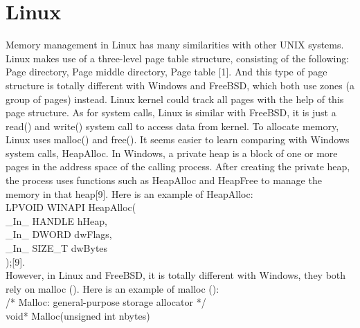 \documentclass[10pt,draftclsnofoot,peerreview,letterpaper,onecolumn,]{IEEEtran}
\begin{document}
\section{Linux}
Memory management in Linux has many similarities with other UNIX systems. Linux makes use of a three-level page table structure, consisting of the following: Page directory, Page middle directory, Page table [1]. And this type of page structure is totally different with Windows and FreeBSD, which both use zones (a group of pages) instead. Linux kernel could track all pages with the help of this page structure.
As for system calls, Linux is similar with FreeBSD, it is just a read() and write() system call to access data from kernel. To allocate memory, Linux uses malloc() and free(). It seems easier to learn comparing with Windows system calls, HeapAlloc. In Windows, a private heap is a block of one or more pages in the address space of the calling process. After creating the private heap, the process uses functions such as HeapAlloc and HeapFree to manage the memory in that heap[9].
Here is an example of HeapAlloc:
~\\LPVOID WINAPI HeapAlloc(
~\\ \_In\_ HANDLE hHeap,
~\\ \_In\_ DWORD  dwFlags,
~\\ \_In\_ SIZE\_T dwBytes
~\\);[9].
~\\However, in Linux and FreeBSD, it is totally different with Windows, they both rely on malloc ().
Here is an example of malloc ():
~\\/* Malloc: general-purpose storage allocator */
~\\void* Malloc(unsigned int nbytes)
\end{document}
